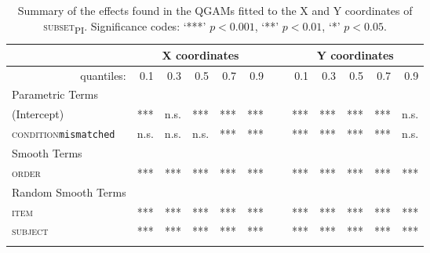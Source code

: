 \begin{table}\fontsize{9}{10}
\caption{Summary of the effects found in the QGAMs fitted to the X and Y coordinates of \textsc{subset\textsubscript{PI}}. Significance codes: `***' $p < 0.001$, `**' $p < 0.01$, `*' $p < 0.05$.}
\label{tab:8.8}
\centering
\begin{tabular}{lrrrrrrrrrrr}
\lsptoprule
~                   & \multicolumn{5}{c}{X coordinates}    & \multicolumn{1}{c}{}                          & \multicolumn{5}{c}{Y coordinates}                               \\
\midrule
\multicolumn{1}{r}{quantiles:}          & 0.1        & 0.3        & 0.5        & 0.7        & 0.9  & ~      & 0.1        & 0.3        & 0.5        & 0.7        & 0.9         \\
\midrule
Parametric Terms    & \textbf{~} & \textbf{~} & \textbf{~} & \textbf{~} & \textbf{~} & \textbf{~} & \textbf{~} & \textbf{~} & \textbf{~} & \textbf{~}  \\
\midrule
(Intercept)         & ***        & n.s.         & ***        & ***        & ***    & ~    & ***        & ***        & ***        & ***        & n.s.          \\
\textsc{condition}\texttt{mismatched} & n.s.       & n.s.          & n.s.        & ***        & *** & ~       & ***       & ***        & ***        & ***        & n.s.         \\
\midrule
Smooth Terms        & \textbf{~} & \textbf{~} & \textbf{~} & \textbf{~} & \textbf{~} & \textbf{~} & \textbf{~} & \textbf{~} & \textbf{~} & \textbf{~}  \\
\midrule
\textsc{order}               & ***        & ***        & ***        & ***        & ***  & ~      & ***        & ***        & ***        & ***        & ***         \\
\midrule
Random Smooth Terms & \textbf{~} & \textbf{~} & \textbf{~} & \textbf{~} & \textbf{~} & \textbf{~} & \textbf{~} & \textbf{~} & \textbf{~} & \textbf{~}  \\
\midrule
\textsc{item}                & ***        & ***        & ***        & ***        & ***  & ~      & ***        & ***        & ***        & ***        & ***         \\
\textsc{subject}             & ***        & ***        & ***        & ***        & ***  & ~      & ***        & ***        & ***        & ***        & ***        \\
\lspbottomrule
\end{tabular}
\end{table}

